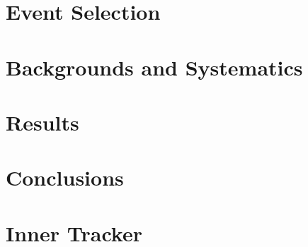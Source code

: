 \documentclass{brandeis-dissertation}
\begin{document}
\chapter{Event Selection}
\label{sec:EventSelection}

\clearpage
\chapter{Backgrounds and Systematics}
\label{sec:BackgroundsSys}

\clearpage
\chapter{Results}
\label{sec:Results}

\clearpage
%

\clearpage
\chapter{Conclusions}
\label{sec:conclusion}

\clearpage



\clearpage
\appendix
\chapter{Inner Tracker}
\label{sec:ITk}


\clearpage
\end{document}
